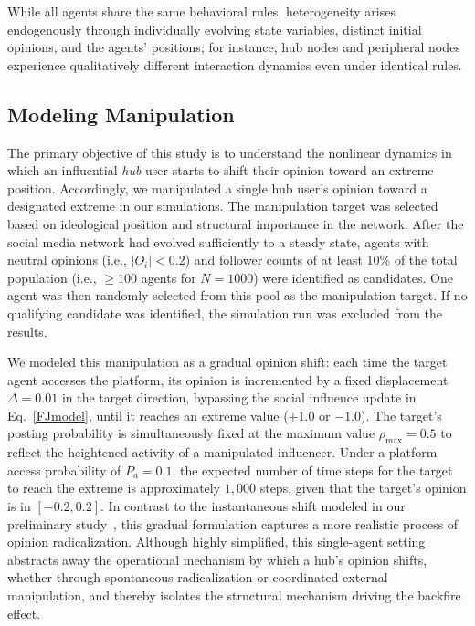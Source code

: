 \documentclass[pdflatex,sn-mathphys-num]{sn-jnl}%
\theoremstyle{thmstyleone}%
\theoremstyle{thmstyletwo}%
\theoremstyle{thmstylethree}%
\begin{document}
While all agents share the same behavioral rules, heterogeneity
arises endogenously through individually evolving state variables,
distinct initial opinions, and the agents' positions; for instance, hub
nodes and peripheral nodes experience qualitatively
different interaction dynamics even under identical rules.


\subsection{Modeling Manipulation}

The primary objective of this study is to
understand the nonlinear dynamics in which an influential \emph{hub}
user starts to shift their opinion toward an extreme position. Accordingly, we manipulated a single hub user's opinion toward a designated extreme in our simulations. The manipulation target was selected based on ideological position and structural importance in the network.
After the social media network had evolved sufficiently
to a steady state,
agents with neutral opinions (i.e., $|O_i| < 0.2$) and
follower counts of at least 10\% of the total population (i.e., $\geq 100$ agents for $N = 1000$)
were identified as candidates. One agent was then randomly
selected from this pool as the manipulation target.
If no qualifying candidate was identified, the simulation run was excluded from the results.
\par

We modeled this manipulation as a gradual opinion shift:
each time the target agent accesses the platform, its opinion is
incremented by a fixed displacement $\Delta = 0.01$ in the target direction,
bypassing the social influence update in Eq.~\eqref{FJmodel},
until it reaches an extreme value ($+1.0$ or $-1.0$).
The target's posting probability is simultaneously fixed
at the maximum value $\rho_{\max} = 0.5$ to reflect
the heightened activity of a manipulated influencer.
Under a platform access probability of $P_a = 0.1$, the expected number of time steps for the target to
reach the extreme is approximately $1{,}000$ steps, given that the target's opinion is in $[-0.2, 0.2]$.
In contrast to the instantaneous shift modeled in our preliminary study~\cite{Takeda2026},
this gradual formulation captures
a more realistic process of opinion radicalization.
Although highly simplified, this single-agent setting abstracts away the operational
mechanism by which a hub's opinion shifts, whether through spontaneous radicalization or
coordinated external manipulation, and thereby isolates the structural
mechanism driving the backfire effect.
\par
\end{document}
